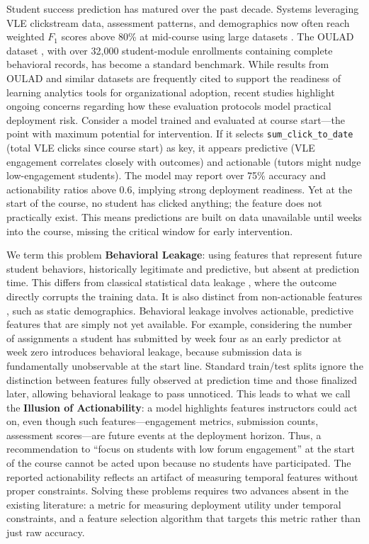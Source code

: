 \documentclass[a4paper,fleqn]{cas-sc}
\begin{document}
Student success prediction has matured over the past decade. Systems leveraging VLE clickstream data, assessment patterns, and demographics now often reach weighted $F_1$ scores above 80\% at mid-course using large datasets \cite{hlosta2017, waheed2020}. The OULAD dataset \cite{kuzilek2017}, with over 32,000 student-module enrollments containing complete behavioral records, has become a standard benchmark. While results from OULAD and similar datasets are frequently cited to support the readiness of learning analytics tools for organizational adoption, recent studies highlight ongoing concerns regarding how these evaluation protocols model practical deployment risk. Consider a model trained and evaluated at course start---the point with maximum potential for intervention. If it selects \texttt{sum\_click\_to\_date} (total VLE clicks since course start) as key, it appears predictive (VLE engagement correlates closely with outcomes) and actionable (tutors might nudge low-engagement students). The model may report over 75\% accuracy and actionability ratios above 0.6, implying strong deployment readiness. Yet at the start of the course, no student has clicked anything; the feature does not practically exist. This means predictions are built on data unavailable until weeks into the course, missing the critical window for early intervention.

We term this problem \textbf{Behavioral Leakage}: using features that represent future student behaviors, historically legitimate and predictive, but absent at prediction time. This differs from classical statistical data leakage \cite{kaufman2012, kapoor2023}, where the outcome directly corrupts the training data. It is also distinct from non-actionable features \cite{baker2014}, such as static demographics. Behavioral leakage involves actionable, predictive features that are simply not yet available. For example, considering the number of assignments a student has submitted by week four as an early predictor at week zero introduces behavioral leakage, because submission data is fundamentally unobservable at the start line. Standard train/test splits ignore the distinction between features fully observed at prediction time and those finalized later, allowing behavioral leakage to pass unnoticed. This leads to what we call the \textbf{Illusion of Actionability}: a model highlights features instructors could act on, even though such features---engagement metrics, submission counts, assessment scores---are future events at the deployment horizon. Thus, a recommendation to ``focus on students with low forum engagement'' at the start of the course cannot be acted upon because no students have participated. The reported actionability reflects an artifact of measuring temporal features without proper constraints. Solving these problems requires two advances absent in the existing literature: a metric for measuring deployment utility under temporal constraints, and a feature selection algorithm that targets this metric rather than just raw accuracy.
\end{document}
